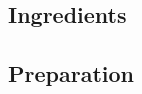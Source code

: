 \documentclass[fontsize=15pt,paper=a4]{scrdoc}
\begin{document}
\section*{}
\vspace{-15pt}
\subsection*{Ingredients}
\begin{multicols}{2}
    \begin{itemize}[left=0pt, label={}, itemsep=-0.5em, font=\ttfamily]
        
    \end{itemize}
\end{multicols}
\subsection*{Preparation}
\begin{enumerate}[label=\arabic*.]
    
\end{enumerate}
\end{document}
